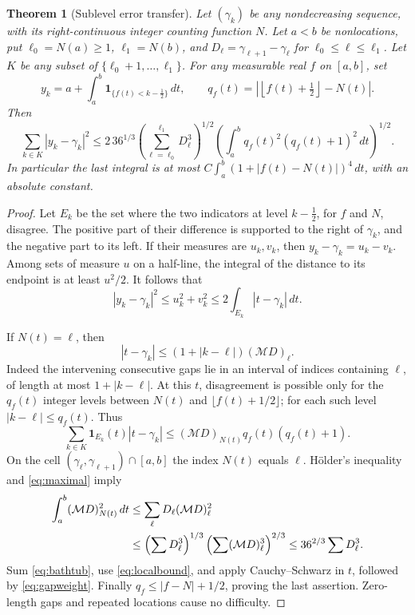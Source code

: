 \documentclass[11pt]{article}
\numberwithin{equation}{section}
\newtheorem{theorem}{Theorem}[section]
\theoremstyle{remark}
\newcommand{\Ind}{\mathbf 1}
\begin{document}
\begin{theorem}[Sublevel error transfer]\label{thm:transfer}
Let \((\gamma_k)\) be any nondecreasing sequence, with its right-continuous
integer counting function \(N\). Let \(a<b\) be nonlocations, put
\(\ell_0=N(a)\ge1\), \(\ell_1=N(b)\), and
\(D_\ell=\gamma_{\ell+1}-\gamma_\ell\) for
\(\ell_0\le\ell\le\ell_1\). Let \(K\) be any subset of
\(\{\ell_0+1,\dots,\ell_1\}\). For any measurable real \(f\) on \([a,b]\), set
\[
 y_k=a+\int_a^b\Ind_{\{f(t)<k-\tfrac12\}}\,dt,\qquad
 q_f(t)=\left|\left\lfloor f(t)+\tfrac12\right\rfloor-N(t)\right|.
\]
Then
\begin{equation}
 \boxed{\quad
 \sum_{k\in K}|y_k-\gamma_k|^2
 \le2\,36^{1/3}
       \left(\sum_{\ell=\ell_0}^{\ell_1}D_\ell^3\right)^{1/2}
       \left(\int_a^b q_f(t)^2(q_f(t)+1)^2\,dt\right)^{1/2}.
 \quad}
 \label{eq:transfer}
\end{equation}
In particular the last integral is at most
\(C\int_a^b(1+|f(t)-N(t)|)^4\,dt\), with an absolute constant.
\end{theorem}
\begin{proof}
Let \(E_k\) be the set where the two indicators at level \(k-\tfrac12\),
for \(f\) and \(N\), disagree. The positive part of their difference is
supported to the right of \(\gamma_k\), and the negative part to its
left. If their measures are \(u_k,v_k\), then
\(y_k-\gamma_k=u_k-v_k\). Among sets of measure \(u\) on a half-line,
the integral of the distance to its endpoint is at least \(u^2/2\).
It follows that
\begin{equation}
 |y_k-\gamma_k|^2
 \le u_k^2+v_k^2
 \le2\int_{E_k}|t-\gamma_k|\,dt.
 \label{eq:bathtub}
\end{equation}

If \(N(t)=\ell\), then
\[
 |t-\gamma_k|\le (1+|k-\ell|)(\mathcal MD)_\ell.
\]
Indeed the intervening consecutive gaps lie in an interval of indices
containing \(\ell\), of length at most \(1+|k-\ell|\).
At this \(t\), disagreement is possible only for the \(q_f(t)\)
integer levels between \(N(t)\) and \(\lfloor f(t)+1/2\rfloor\);
for each such level \(|k-\ell|\le q_f(t)\). Thus
\begin{equation}
 \sum_{k\in K}\Ind_{E_k}(t)|t-\gamma_k|
 \le(\mathcal MD)_{N(t)}q_f(t)(q_f(t)+1).
 \label{eq:localbound}
\end{equation}
On the cell \((\gamma_\ell,\gamma_{\ell+1})\cap[a,b]\) the index \(N(t)\)
equals \(\ell\). H\"older's inequality and \eqref{eq:maximal} imply
\begin{align}
 \int_a^b(\mathcal MD)_{N(t)}^2\,dt
 &\le\sum_\ell D_\ell(\mathcal MD)_\ell^2 \notag\\
 &\le\left(\sum D_\ell^3\right)^{1/3}
        \left(\sum(\mathcal MD)_\ell^3\right)^{2/3}
 \le36^{2/3}\sum D_\ell^3.
 \label{eq:gapweight}
\end{align}
Sum \eqref{eq:bathtub}, use \eqref{eq:localbound}, and apply
Cauchy--Schwarz in \(t\), followed by \eqref{eq:gapweight}.
Finally \(q_f\le|f-N|+1/2\), proving the last assertion.
Zero-length gaps and repeated locations cause no difficulty.
\end{proof}
\end{document}
